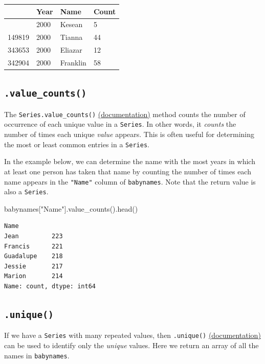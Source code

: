\documentclass[
  letterpaper,
  DIV=11,
  numbers=noendperiod]{scrreprt}
\newenvironment{Shaded}{\begin{snugshade}}{\end{snugshade}}
\newcommand{\NormalTok}[1]{\textcolor[rgb]{0.00,0.23,0.31}{#1}}
\newcommand{\StringTok}[1]{\textcolor[rgb]{0.13,0.47,0.30}{#1}}
\begin{document}
\begin{longtable}[]{@{}llll@{}}
\toprule\noalign{}
& Year & Name & Count \\
\midrule\noalign{}
\endhead
\bottomrule\noalign{}
\endlastfoot
344817 & 2000 & Kesean & 5 \\
149819 & 2000 & Tianna & 44 \\
343653 & 2000 & Eliazar & 12 \\
342904 & 2000 & Franklin & 58 \\
\end{longtable}

\subsection{\texorpdfstring{\texttt{.value\_counts()}}{.value\_counts()}}\label{value_counts}

The \texttt{Series.value\_counts()}
\href{https://pandas.pydata.org/docs/reference/api/pandas.Series.value_counts.html}{(documentation)}
method counts the number of occurrence of each unique value in a
\texttt{Series}. In other words, it \emph{counts} the number of times
each unique \emph{value} appears. This is often useful for determining
the most or least common entries in a \texttt{Series}.

In the example below, we can determine the name with the most years in
which at least one person has taken that name by counting the number of
times each name appears in the \texttt{"Name"} column of
\texttt{babynames}. Note that the return value is also a
\texttt{Series}.

\begin{Shaded}
\begin{Highlighting}[]
\NormalTok{babynames[}\StringTok{"Name"}\NormalTok{].value\_counts().head()}
\end{Highlighting}
\end{Shaded}

\begin{verbatim}
Name
Jean         223
Francis      221
Guadalupe    218
Jessie       217
Marion       214
Name: count, dtype: int64
\end{verbatim}

\subsection{\texorpdfstring{\texttt{.unique()}}{.unique()}}\label{unique}

If we have a \texttt{Series} with many repeated values, then
\texttt{.unique()}
\href{https://pandas.pydata.org/docs/reference/api/pandas.unique.html}{(documentation)}
can be used to identify only the \emph{unique} values. Here we return an
array of all the names in \texttt{babynames}.
\end{document}
